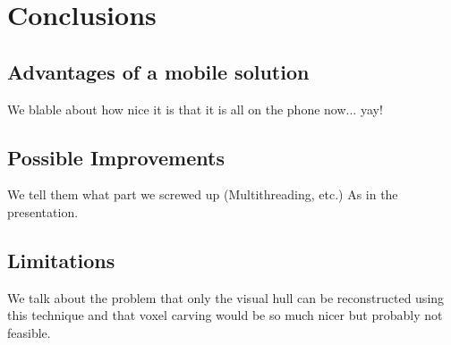 \documentclass[10pt,twocolumn,letterpaper]{article}
\begin{document}
\section{Conclusions}

\subsection{Advantages of a mobile solution}

We blable about how nice it is that it is all on the phone now... yay!

\subsection{Possible Improvements}

We tell them what part we screwed up (Multithreading, etc.) As in the presentation.

\subsection{Limitations}

We talk about the problem that only the visual hull can be reconstructed using this technique and that voxel carving would be so much nicer but probably not feasible.


{\small


}
\end{document}
